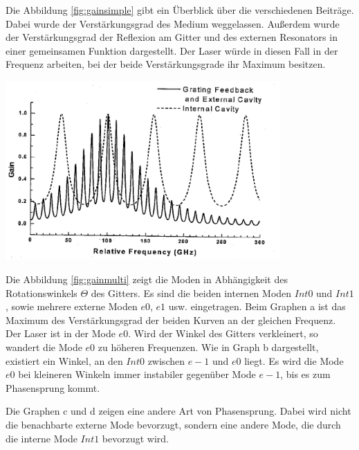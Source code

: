 \documentclass[captions=tableheading]{scrartcl}
\begin{document}
Die Abbildung \ref{fig:gainsimple} gibt ein Überblick über die verschiedenen Beiträge. 
Dabei wurde der Verstärkungsgrad des Medium weggelassen. 
Außerdem wurde der Verstärkungsgrad der Reflexion am Gitter und des externen Resonators in einer gemeinsamen Funktion dargestellt. 
Der Laser würde in diesen Fall in der Frequenz arbeiten, bei der beide Verstärkungsgrade ihr Maximum besitzen.
\begin{center}
	\includegraphics[width=10.5cm]{images/gainsimple.png}
	\label{fig:gainsimple}
\end{center}
Die Abbildung \ref{fig:gainmulti} zeigt die Moden in Abhängigkeit des Rotationswinkels $\Theta$ des Gitters. 
Es sind die beiden internen Moden $Int0$ und $Int1$, sowie mehrere externe Moden $e0$, $e1$ usw. eingetragen. 
\newpage
Beim Graphen a ist das Maximum des Verstärkungsgrad der beiden Kurven an der gleichen Frequenz. Der Laser ist in der Mode $e0$. 
Wird der Winkel des Gitters verkleinert, so wandert die Mode $e0$ zu höheren Frequenzen. 
Wie in Graph b dargestellt, existiert ein Winkel, an den $Int0$ zwischen $e-1$ und $e0$ liegt.
Es wird die Mode $e0$ bei kleineren Winkeln immer instabiler gegenüber Mode $e-1$, bis es zum Phasensprung kommt.

Die Graphen c und d zeigen eine andere Art von Phasensprung. Dabei wird nicht die benachbarte externe Mode bevorzugt, sondern eine andere Mode, die durch die interne Mode $Int1$ bevorzugt wird. 
\end{document}
